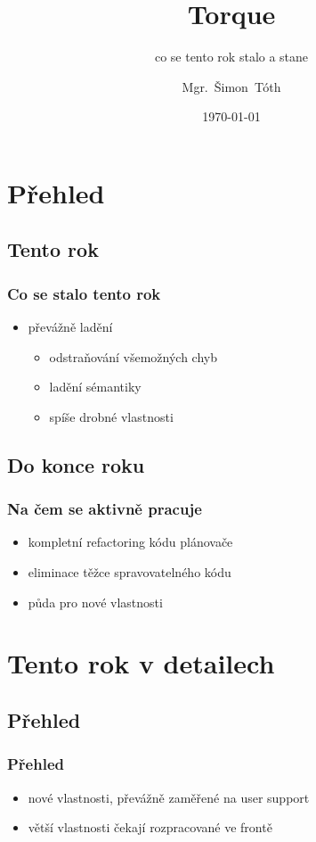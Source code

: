 \documentclass[pdftex,aspectratio=169]{beamer}
\title{Torque}
\subtitle{co se tento rok stalo a stane}
\author[]{Mgr.~Šimon~Tóth}
\date{\today}
\begin{document}
\begin{frame}
	\titlepage
\end{frame}

\section{Přehled}
\subsection{Tento rok}

\begin{frame}
	\frametitle{Co se stalo tento rok}
	\pause
	\begin{itemize}
		\item{převážně ladění}
		\begin{itemize}
			\item{odstraňování všemožných chyb}
			\item{ladění sémantiky}
			\item{spíše drobné vlastnosti}
		\end{itemize}
	\end{itemize}
\end{frame}

\subsection{Do konce roku}

\begin{frame}
	\frametitle{Na čem se aktivně pracuje}
	\pause
	\begin{itemize}
		\item{kompletní refactoring kódu plánovače}
		\item{eliminace těžce spravovatelného kódu}
		\item{půda pro nové vlastnosti}
	\end{itemize}
\end{frame}

\section{Tento rok v detailech}
\subsection{Přehled}

\begin{frame}
	\frametitle{Přehled}
	\begin{itemize}
		\item{nové vlastnosti, převážně zaměřené na user support}
		\item{větší vlastnosti čekají rozpracované ve frontě}
	\end{itemize}
\end{frame}
\end{document}
